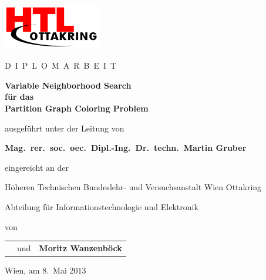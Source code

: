 \begin{titlepage}
\begin{center}
\includegraphics[height=2cm]{../img/htl.png}

\vspace{10mm}

{\Large D}\ {\large I\ P\ L\ O\ M\ A\ R\ B\ E\ I\ T}

\vspace{25mm}

{\Huge\bfseries\sffamily Variable Neighborhood Search}\\[3mm]
{\Huge\bfseries\sffamily für das}\\[3mm]
{\Huge\bfseries\sffamily Partition Graph Coloring Problem}

\vspace{15mm}

ausgeführt unter der Leitung von

\vspace{5mm}

{\large\bfseries Mag.~rer.~soc.~oec.\ Dipl.-Ing.\ Dr.~techn.\ Martin Gruber}

\vspace{5mm}

eingereicht an der

\vspace{5mm}

{\large Höheren Technischen Bundeslehr- und Versuchsanstalt Wien Ottakring}

{\large Abteilung für Informationstechnologie und Elektronik}

\vspace{5mm}

von

\vspace{5mm}
\begin{tabular}{>{\raggedright\arraybackslash}p{}c>{\raggedleft\arraybackslash}p{}}
{\large\bfseries Lorenz Leutgeb} & und & {\large\bfseries Moritz Wanzenböck} \\
\end{tabular}
\end{center}
\vspace*{\fill}

Wien, am 8.~Mai 2013
\end{titlepage}
